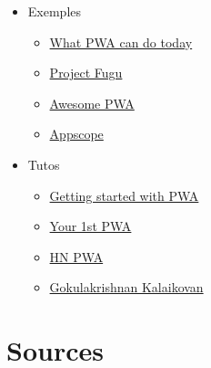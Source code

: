 \begin{itemize}
\tightlist
\item
  Exemples

  \begin{itemize}
  \tightlist
  \item
    \href{https://whatpwacando.today/}{What PWA can do today}
  \item
    \href{https://developer.chrome.com/blog/fugu-showcase/}{Project
    Fugu}
  \item
    \href{https://github.com/hemanth/awesome-pwa}{Awesome PWA}
  \item
    \href{https://appsco.pe/}{Appscope}
  \end{itemize}
\item
  Tutos

  \begin{itemize}
  \tightlist
  \item
    \href{https://addyosmani.com/blog/getting-started-with-progressive-web-apps/}{Getting
    started with PWA}
  \item
    \href{https://developers.google.com/web/fundamentals/codelabs/your-first-pwapp/}{Your
    1st PWA}
  \item
    \href{https://hnpwa.com/}{HN PWA}
  \item
    \href{https://github.com/gokulkrishh}{Gokulakrishnan Kalaikovan}
  \end{itemize}
\end{itemize}

\hypertarget{sources}{%
\section{Sources}\label{sources}}
